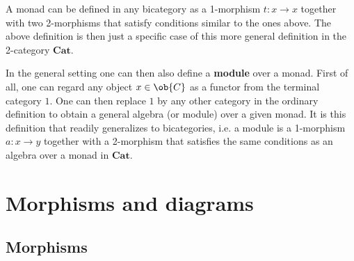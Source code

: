     \begin{remark}
        A monad can be defined in any bicategory as a 1-morphism $t:x\rightarrow x$ together with two 2-morphisms that satisfy conditions similar to the ones above. The above definition is then just a specific case of this more general definition in the 2-category $\mathbf{Cat}$.

        In the general setting one can then also define a \textbf{module} over a monad. First of all, one can regard any object $x\in\ob{C}$ as a functor from the terminal category $1$. One can then replace $1$ by any other category in the ordinary definition to obtain a general algebra (or module) over a given monad. It is this definition that readily generalizes to bicategories, i.e. a module is a 1-morphism $a:x\rightarrow y$ together with a 2-morphism that satisfies the same conditions as an algebra over a monad in $\mathbf{Cat}$.
    \end{remark}

\section{Morphisms and diagrams}\label{section:morphisms}
\subsection{Morphisms}



